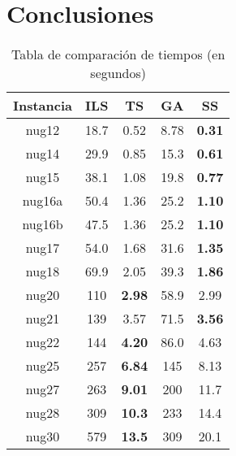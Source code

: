 \documentclass{ci5652}
\begin{document}
\section*{Conclusiones}

\begin{table}[ht]
\centering
\caption{Tabla de comparación de tiempos (en segundos)}
\label{table:time}
\begin{tabular}{|c|c|c|c|c|}
\hline
{\bf Instancia} & {\bf ILS} & {\bf TS}   & {\bf GA} & {\bf SS}   \\ \hline
nug12           & 18.7      & 0.52       & 8.78     & {\bf 0.31} \\ \hline
nug14           & 29.9      & 0.85       & 15.3     & {\bf 0.61} \\ \hline
nug15           & 38.1      & 1.08       & 19.8     & {\bf 0.77} \\ \hline
nug16a          & 50.4      & 1.36       & 25.2     & {\bf 1.10} \\ \hline
nug16b          & 47.5      & 1.36       & 25.2     & {\bf 1.10} \\ \hline
nug17           & 54.0      & 1.68       & 31.6     & {\bf 1.35} \\ \hline
nug18           & 69.9      & 2.05       & 39.3     & {\bf 1.86} \\ \hline
nug20           & 110       & {\bf 2.98} & 58.9     & 2.99       \\ \hline
nug21           & 139       & 3.57       & 71.5     & {\bf 3.56} \\ \hline
nug22           & 144       & {\bf 4.20} & 86.0     & 4.63       \\ \hline
nug25           & 257       & {\bf 6.84} & 145      & 8.13       \\ \hline
nug27           & 263       & {\bf 9.01} & 200      & 11.7       \\ \hline
nug28           & 309       & {\bf 10.3} & 233      & 14.4       \\ \hline
nug30           & 579       & {\bf 13.5} & 309      & 20.1       \\ \hline
\end{tabular}
\end{table}


%


\small

 
\end{document}
